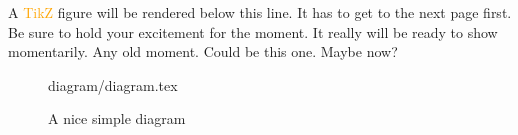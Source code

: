 A \textcolor{orange}{TikZ}
 figure will be rendered below this line. It has to get to the next page first. Be sure to hold your excitement for the moment. It really will be ready to show momentarily. Any old moment. Could be this one. Maybe now? 
 \begin{figure}[ht]
 {diagram/diagram.tex}
 \label{fig:tikzexample}
\caption{A nice simple diagram}
\end{figure}




